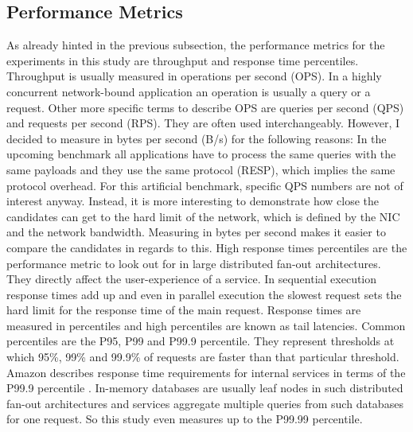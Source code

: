 \subsection{Performance Metrics}
As already hinted in the previous subsection, the performance metrics for the experiments in this study are throughput and response time percentiles. \newline
Throughput is usually measured in operations per second (OPS).  In a highly concurrent network-bound application an operation is usually a query or a request. Other more specific terms to describe OPS are queries per second (QPS) and requests per second (RPS). They are often used interchangeably. \newline
However, I decided to measure in bytes per second (B/s) for the following reasons: 
In the upcoming benchmark all applications have to process the same queries with the same payloads and they use the same protocol (RESP), which implies the same protocol overhead. For this artificial benchmark, specific QPS numbers are not of interest anyway. Instead, it is more interesting to demonstrate how close the candidates can get to the hard limit of the network, which is defined by the NIC and the network bandwidth. Measuring in bytes per second makes it easier to compare the candidates in regards to this. \newline
High response times percentiles are the performance metric to look out for in large distributed fan-out architectures. They directly affect the user-experience of a service. In sequential execution response times add up and even in parallel execution the slowest request sets the hard limit for the response time of the main request. Response times are measured in percentiles and high percentiles are known as tail latencies. Common percentiles are the P95, P99 and P99.9 percentile. They represent thresholds at which 95\%, 99\% and 99.9\% of requests are faster than that particular threshold. Amazon describes response time requirements for internal services in terms of the P99.9 percentile \cite[15]{kleppmann:data}. In-memory databases are usually leaf nodes in such distributed fan-out architectures and services aggregate multiple queries from such databases for one request. So this study even measures up to the P99.99 percentile.

